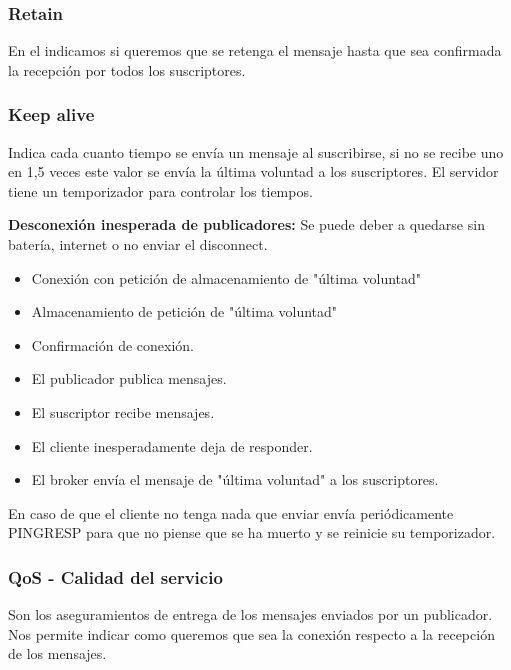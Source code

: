 \documentclass[12pt]{report} %
\begin{document}
\subsubsection{Retain} 
En el indicamos si queremos que se retenga el mensaje hasta que sea confirmada la recepción por todos los suscriptores.

\subsubsection{Keep alive} 
Indica cada cuanto tiempo se envía un mensaje al suscribirse, si no se recibe uno en 1,5 veces este valor se envía la última voluntad a los suscriptores. El servidor tiene un temporizador para controlar los tiempos.

\textbf{Desconexión inesperada de publicadores:} Se puede deber a quedarse sin batería, internet o no enviar el disconnect. 
\begin{itemize}
	\item Conexión con petición de almacenamiento de "última voluntad"
	\item Almacenamiento de petición de "última voluntad"
	\item Confirmación de conexión.
	\item El publicador publica mensajes.
	\item El suscriptor recibe mensajes.
	\item El cliente inesperadamente deja de responder.
	\item El broker envía el mensaje de "última voluntad" a los suscriptores.
\end{itemize}
En caso de que el cliente no tenga nada que enviar envía periódicamente PINGRESP para que no piense que se ha muerto y se reinicie su temporizador.


\subsubsection{QoS - Calidad del servicio}
Son los aseguramientos de entrega de los mensajes enviados por un publicador. Nos permite indicar como queremos que sea la conexión respecto a la recepción de los mensajes.
\end{document}
